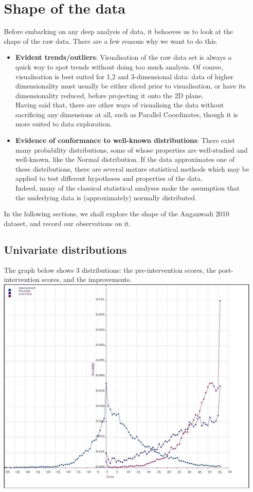 \documentclass[10pt]{article}
\begin{document}
\section{Shape of the data}
Before embarking on any deep analysis of data, it behooves us to look at the shape of the raw data. There are a few reasons why we want to do this.\\
\begin{itemize}
\item \textbf{Evident trends/outliers}: Visualisation of the raw data set is always a quick way to spot trends without doing too much analysis. Of course, visualisation is best suited for 1,2 and 3-dimensional data: data of higher dimensionality must usually be either sliced prior to visualisation, or have its dimensionality reduced, before projecting it onto the 2D plane.\\
Having said that, there are other ways of visualising the data without sacrificing any dimensions at all, such as Parallel Coordinates, though it is more suited to data exploration.
\item \textbf{Evidence of conformance to well-known distributions}: There exist many probability distributions, some of whose properties are well-studied and well-known, like the Normal distribution. If the data approximates one of these distributions, there are several mature statistical methods which may be applied to test different hypotheses and properties of the data.\\
Indeed, many of the classical statistical analyses make the assumption that the underlying data is (approximately) normally distributed.
\end{itemize}

In the following sections, we shall explore the shape of the Anganwadi 2010 dataset, and record our observations on it.

\newpage
\subsection{Univariate distributions}
The graph below shows 3 distributions: the pre-intervention scores, the post-intervention scores, and the improvements.\\
\includegraphics[width=160mm]{ReportMedia/ShapeOfData.jpg}
\end{document}
